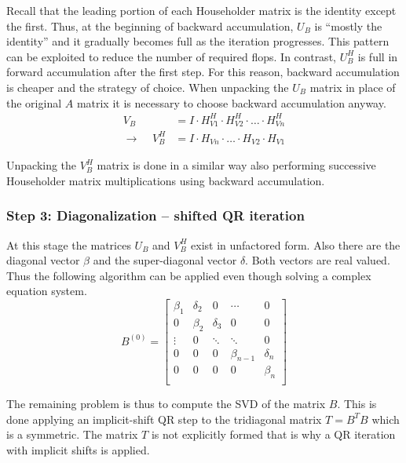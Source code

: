 Recall that the leading portion of each Householder matrix is the
identity except the first.  Thus, at the beginning of backward
accumulation, $U_B$ is ``mostly the identity'' and it gradually
becomes full as the iteration progresses.  This pattern can be
exploited to reduce the number of required flops.  In contrast,
$U_B^H$ is full in forward accumulation after the first step.  For
this reason, backward accumulation is cheaper and the strategy of
choice.  When unpacking the $U_B$ matrix in place of the original $A$
matrix it is necessary to choose backward accumulation anyway.
\begin{align}
V_B\; &= I\cdot H^H_{V1}\cdot H^H_{V2}\cdot \ldots \cdot H^H_{Vn}\\
\rightarrow\;\;\;\; V_B^H &= I\cdot H_{Vn}\cdot \ldots \cdot H_{V2}\cdot H_{V1}
\end{align}

Unpacking the $V_B^H$ matrix is done in a similar way also performing
successive Householder matrix multiplications using backward
accumulation.

\subsubsection{Step 3: Diagonalization -- shifted QR iteration}

At this stage the matrices $U_B$ and $V_B^H$ exist in unfactored form.
Also there are the diagonal vector $\beta$ and the super-diagonal
vector $\delta$.  Both vectors are real valued.  Thus the following
algorithm can be applied even though solving a complex equation
system.
\begin{equation}
B^{(0)} = 
\begin{bmatrix}
\beta_1 & \delta_2 & 0 & \cdots & 0\\
0 & \beta_2 & \delta_3 & 0 & 0\\
\vdots & 0 & \ddots & \ddots & 0\\
0 & 0 & 0 & \beta_{n-1} & \delta_n\\
0 & 0 & 0 & 0 & \beta_n\\
\end{bmatrix}
\end{equation}

The remaining problem is thus to compute the SVD of the matrix $B$.
This is done applying an implicit-shift QR step to the tridiagonal
matrix $T=B^T B$ which is a symmetric.  The matrix $T$ is not
explicitly formed that is why a QR iteration with implicit shifts is
applied.

